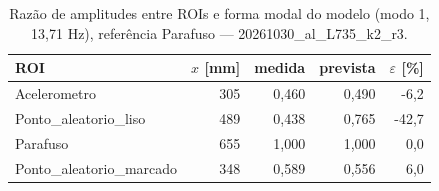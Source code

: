 \begin{table}[htbp]
  \centering
  \caption{Razão de amplitudes entre ROIs e forma modal do modelo (modo 1, 13{,}71 Hz), referência Parafuso — 20261030\_al\_L735\_k2\_r3.}
  \label{tab:forma_modal_20261030_al_L735_k2_r3}
  \begin{tabular}{lrrrr}
    \toprule
    ROI & $x$ [mm] & medida & prevista & $\varepsilon$ [\%] \\
    \midrule
    Acelerometro & 305 & 0{,}460 & 0{,}490 & -6{,}2 \\
    Ponto\_aleatorio\_liso & 489 & 0{,}438 & 0{,}765 & -42{,}7 \\
    Parafuso & 655 & 1{,}000 & 1{,}000 & 0{,}0 \\
    Ponto\_aleatorio\_marcado & 348 & 0{,}589 & 0{,}556 & 6{,}0 \\
    \bottomrule
  \end{tabular}
\end{table}
